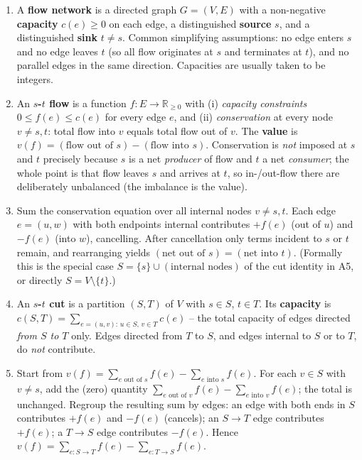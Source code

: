 \documentclass[11pt]{article}
\begin{document}
\begin{enumerate}[label=\textbf{A\arabic*.}, leftmargin=2.2em]

\item A \textbf{flow network} is a directed graph $G=(V,E)$ with a non-negative
\textbf{capacity} $c(e) \ge 0$ on each edge, a distinguished \textbf{source} $s$, and a
distinguished \textbf{sink} $t \ne s$. Common simplifying assumptions: no edge enters $s$
and no edge leaves $t$ (so all flow originates at $s$ and terminates at $t$), and no
parallel edges in the same direction. Capacities are usually taken to be integers.

\item An \textbf{$s$-$t$ flow} is a function $f:E\to\mathbb{R}_{\ge0}$ with (i)
\emph{capacity constraints} $0 \le f(e) \le c(e)$ for every edge $e$, and (ii)
\emph{conservation} at every node $v \ne s,t$: total flow into $v$ equals total flow out
of $v$. The \textbf{value} is $v(f) = (\text{flow out of }s) - (\text{flow into }s)$.
Conservation is \emph{not} imposed at $s$ and $t$ precisely because $s$ is a net
\emph{producer} of flow and $t$ a net \emph{consumer}; the whole point is that flow leaves
$s$ and arrives at $t$, so in-/out-flow there are deliberately unbalanced (the imbalance is
the value).

\item Sum the conservation equation over all internal nodes $v \ne s,t$. Each edge $e =
(u,w)$ with both endpoints internal contributes $+f(e)$ (out of $u$) and $-f(e)$ (into
$w$), cancelling. After cancellation only terms incident to $s$ or $t$ remain, and
rearranging yields $(\text{net out of }s) = (\text{net into }t)$. (Formally this is the
special case $S=\{s\}\cup(\text{internal nodes})$ of the cut identity in A5, or directly
$S = V\setminus\{t\}$.)

\item An \textbf{$s$-$t$ cut} is a partition $(S,T)$ of $V$ with $s\in S$, $t\in T$. Its
\textbf{capacity} is $c(S,T) = \sum_{e=(u,v):\,u\in S,\,v\in T} c(e)$ -- the total
capacity of edges directed \emph{from $S$ to $T$} only. Edges directed from $T$ to $S$,
and edges internal to $S$ or to $T$, do \emph{not} contribute.

\item Start from $v(f) = \sum_{e\text{ out of }s} f(e) - \sum_{e\text{ into }s} f(e)$. For
each $v \in S$ with $v \ne s$, add the (zero) quantity $\sum_{e\text{ out of }v} f(e) -
\sum_{e\text{ into }v} f(e)$; the total is unchanged. Regroup the resulting sum by edges:
an edge with both ends in $S$ contributes $+f(e)$ and $-f(e)$ (cancels); an $S\to T$ edge
contributes $+f(e)$; a $T\to S$ edge contributes $-f(e)$. Hence
$v(f) = \sum_{e:S\to T} f(e) - \sum_{e:T\to S} f(e)$.


\end{enumerate}
\end{document}
